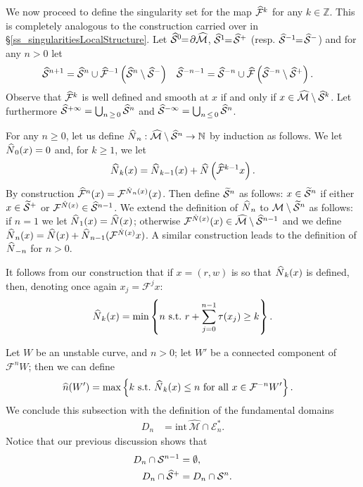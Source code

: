 \documentclass[AHL, Unicode, longabstracts,published]{cedram}
\newcommand{\ct}{r}
\newcommand{\st}{\ \text{s.t.}\ }
\newcommand{\intr}[1]{\mathrm{int}\,#1}
\newcommand{\inv}{^{-1}}
\newcommand{\integers}{\mathbb{Z}}
\newcommand{\bN}{\mathbb{N}}
\newcommand{\cEs}{\mathcal E^{*}}
\newcommand{\cm}{\mathcal{F}}
\newcommand{\csp}{\mathcal{M}}
\newcommand{\cmp}{\hat\cm}
\newcommand{\cspi}{\widehat{\csp}}
\newcommand{\singPrivate}{\mathcal{S}}
\newcommand{\sing}[1]{\singPrivate^{#1}}
\newcommand{\singp}[1]{\hat{\singPrivate}^{#1}}
\newcommand{\singt}[1]{\tilde{\singPrivate}^{#1}}
\newcommand{\Np}{\hat N}
\newcommand{\Dom}{D}
\let\oldtilde\tilde
\renewcommand*{\tilde}[1]{\mathchoice{\widetilde{#1}}{\widetilde{#1}}{\oldtilde{#1}}{\oldtilde{#1}}}
\let\oldhat\hat
\renewcommand*{\hat}[1]{\mathchoice{\widehat{#1}}{\widehat{#1}}{\oldhat{#1}}{\oldhat{#1}}}
\begin{document}
We now proceed to define the singularity set for the map $\cmp^k$ for any $k\in\integers$. This is completely analogous to the construction carried over in \S\ref{ss_singularitiesLocalStructure}. Let $\singp0\!\!=\!\partial\cspi$, $\singp1\!\!=\!\singp+$ (resp. $\singp{-1}\!\!=\! \singp-$) and for any $n > 0$ let
\begin{align*}
\singp{n+1} &=\singp{n}\cup\cmp\inv\left(\singp{n}\setminus\singp-\right) &\singp{-n-1} &=\singp{-n}\cup\cmp\left(\singp{-n}\setminus\singp+\right).
\end{align*}
Observe that $\cmp^k$ is well defined and smooth at $x$ if and only if $x\in\cspi\setminus\singp{k}$. Let furthermore $\singp{+\infty} = \bigcup_{n\,\ge\,0}\singp{n}$ and $\singp{-\infty} = \bigcup_{n\,\le\,0}\singp{n}$.

For any $n \ge 0$, let us define $\Np_{n}:\cspi\setminus\singp{n}\to\bN$ by induction as follows. We let $\Np_{0}(x) = 0$ and, for $k \ge 1$, we let
\begin{align*}
\Np_{k}(x) = \Np_{k-1}(x)+\Np\left(\cmp^{k -1}x\right).
\end{align*}
By construction $\cmp^{n}(x) = \cm^{\Np_{n}(x)}(x)$. Then define $\singt{n}$ as follows: $x\in\singt{n}$ if either $x\in\singt{+}$ or $\cm^{\Np(x)}\in\singp{n-1}$. We extend the definition of $\Np_{n}$ to $\csp\setminus\singt{n}$ as follows: if $n = 1$ we let $\Np_{1}(x) = \Np(x)$; otherwise $\cm^{\Np(x)}(x)\in\cspi\setminus\singp{n-1}$ and we define $\Np_{n}(x) = \Np(x)+\Np_{n-1}(\cm^{\Np(x)}x)$. A similar construction leads to the definition of $\Np_{-n}$ for $n > 0$.

\begin{rema}\label{remark:definition-Npk}
It follows from our construction that if $x = (r,w)$ is so that $\Np_{k}(x)$ is defined, then, denoting once again $x_{j} = \cm^{j}x$:
\begin{align*}
\Np_{k}(x) = \min \left\{n \st \ct+\sum_{j = 0}^{n-1}\tau(x_{j})\ge k\right\}.
\end{align*}
\end{rema}

Let $W$ be an unstable curve, and $n > 0$; let $W'$ be a connected component of $\cm^{n}W$; then we can define
\begin{align}\label{eq:definition-hatn}
\hat n(W') &= \max \left\{k \st \Np_{k}(x)\le n \text{ for all } x\in \cm^{-n}W'\right\}.
\end{align}
We conclude this subsection with the definition of the fundamental domains
\begin{align}\label{e_fundamentalDomains}
\Dom_n &= \intr\cspi\cap\cEs_n.
\end{align}
Notice that our previous discussion shows that
\begin{subequations}\label{e_domainSingularities}
\begin{align}
\Dom_{n}\cap\sing{n-1} &= \emptyset,\\
\Dom_n\cap\singp+ &= \Dom_n\cap\sing{n}.
\end{align}
\end{subequations}
\end{document}
